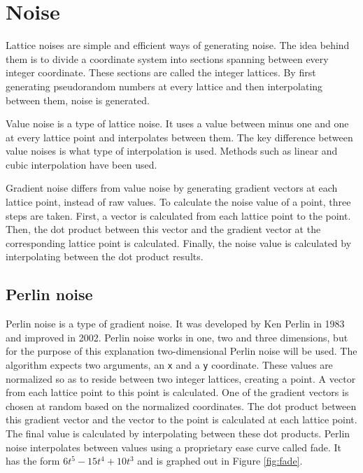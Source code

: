 \section{Noise}
Lattice noises are simple and efficient ways of generating noise\cite{TexturingModeling}. The idea behind them is to divide a coordinate system into sections spanning between every integer coordinate. These sections are called the integer lattices. By first generating pseudorandom numbers at every lattice and then interpolating between them, noise is generated.
		
\par
Value noise is a type of lattice noise. It uses a value between minus one and one at every lattice point and interpolates between them. The key difference between value noises is what type of interpolation is used. Methods such as linear and cubic interpolation have been used\cite{TexturingModeling}.
		
\par
Gradient noise differs from value noise by generating gradient vectors at each lattice point, instead of raw values. To calculate the noise value of a point, three steps are taken. First, a vector is calculated from each lattice point to the point.  Then, the dot product between this vector and the gradient vector at the corresponding lattice point is calculated. Finally, the noise value is calculated by interpolating between the dot product results.
		
\subsection{Perlin noise}
Perlin noise is a type of gradient noise. It was developed by Ken Perlin in 1983 and improved in 2002\cite{PerlinNoise}. Perlin noise works in one, two and three dimensions, but for the purpose of this explanation two-dimensional Perlin noise will be used. The algorithm expects two arguments, an \texttt{x} and a \texttt{y} coordinate. These values are normalized so as to reside between two integer lattices, creating a point. A vector from each lattice point to this point is calculated. One of the gradient vectors is chosen at random based on the normalized coordinates. The dot product between this gradient vector and the vector to the point is calculated at each lattice point. The final value is calculated by interpolating between these dot products. Perlin noise interpolates between values using a proprietary ease curve called fade. It has the form \begin{math}6t^5-15t^4+10t^3\end{math} and is graphed out in Figure \ref{fig:fade}.
		
